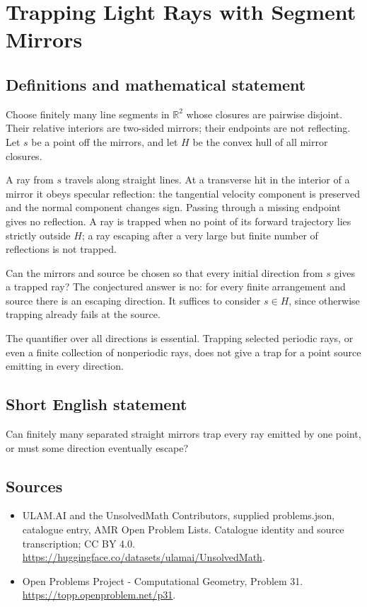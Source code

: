 \documentclass[11pt,a4paper]{article}
\begin{document}
\section*{Trapping Light Rays with Segment Mirrors}\label{statement}

\subsection{Definitions and mathematical statement}
Choose finitely many line segments in $\mathbb R^2$ whose closures are
pairwise disjoint. Their relative interiors are two-sided mirrors;
their endpoints are not reflecting. Let $s$ be a point off the mirrors,
and let $H$ be the convex hull of all mirror closures.

A ray from $s$ travels along straight lines. At a transverse hit in
the interior of a mirror it obeys specular reflection: the tangential
velocity component is preserved and the normal component changes sign.
Passing through a missing endpoint gives no reflection. A ray is
trapped when no point of its forward trajectory lies strictly outside
$H$; a ray escaping after a very large but finite number of reflections
is not trapped.

Can the mirrors and source be chosen so that every initial direction
from $s$ gives a trapped ray? The conjectured answer is no: for every
finite arrangement and source there is an escaping direction. It
suffices to consider $s\in H$, since otherwise trapping already fails
at the source.

The quantifier over all directions is essential. Trapping selected
periodic rays, or even a finite collection of nonperiodic rays, does
not give a trap for a point source emitting in every direction.
\subsection{Short English statement}
Can finitely many separated straight mirrors trap every ray emitted
by one point, or must some direction eventually escape?
\subsection{Sources}
\begin{itemize}
\item[S1] ULAM.AI and the UnsolvedMath Contributors, supplied problems.json, catalogue entry, AMR Open Problem Lists. Catalogue identity and source transcription; CC BY 4.0.
\url{https://huggingface.co/datasets/ulamai/UnsolvedMath}.
\item[S2] Open Problems Project - Computational Geometry, Problem 31. 
\url{https://topp.openproblem.net/p31}.
\end{itemize}
\end{document}
